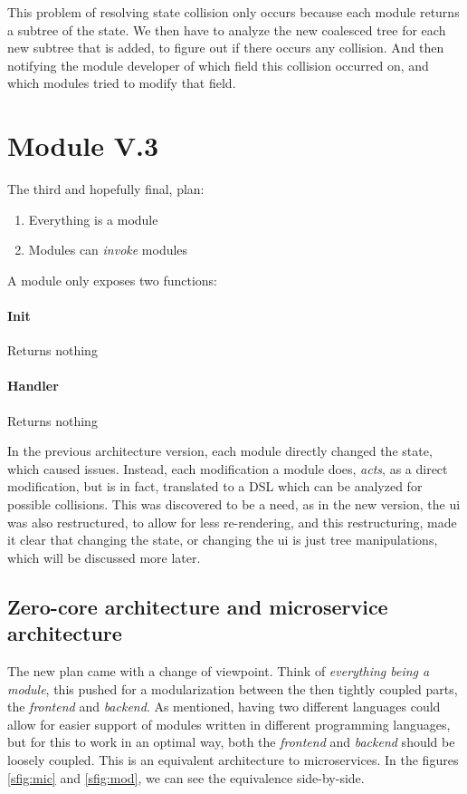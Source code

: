 This problem of resolving state collision only occurs because each module
returns a subtree of the state. We then have to analyze the new coalesced tree
for each new subtree that is added, to figure out if there occurs any collision.
And then notifying the module developer of which field this collision occurred
on, and which modules tried to modify that field.

\section{Module V.3} \label{sec:moD3}

The third and hopefully final, plan:

\begin{enumerate}
  \item Everything is a module
  \item Modules can \textit{invoke} modules
\end{enumerate}

A module only exposes two functions:

\paragraph{Init} Returns nothing

\paragraph{Handler} Returns nothing

In the previous architecture version, each module directly changed the state,
which caused issues. Instead, each modification a module does, \textit{acts}, as
a direct modification, but is in fact, translated to a DSL which can be analyzed
for possible collisions. This was discovered to be a need, as in the new
version, the \gls*{ui} was also restructured, to allow for less re-rendering, and
this restructuring, made it clear that changing the state, or changing the
\gls*{ui} is just tree manipulations, which will be discussed more later.

\subsection{Zero-core architecture and microservice architecture}

The new plan came with a change of viewpoint. Think of
\textit{everything being a module}, this pushed for a modularization between the
then tightly coupled parts, the \textit{frontend} and \textit{backend}. As
mentioned, having two different languages could allow for easier support of
modules written in different programming languages, but for this to work in an
optimal way, both the \textit{frontend} and \textit{backend} should be loosely
coupled. This is an equivalent architecture to microservices. In the figures
\ref{sfig:mic} and \ref{sfig:mod}, we can see the equivalence side-by-side.

